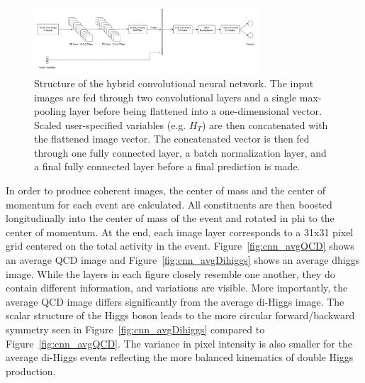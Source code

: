 \begin{figure}[!h] 
\begin{center}
\includegraphics*[width=0.75\textwidth] {CNN/figures/hybridCNN.png}
\caption{Structure of the hybrid convolutional neural network. The input images are fed through two convolutional layers and a single max-pooling layer before being flattened into a one-dimensional vector. Scaled user-specified variables (e.g. $H_{T}$) are then concatenated with the flattened image vector. The concatenated vector is then fed through one fully connected layer, a batch normalization layer, and a final fully connected layer before a final prediction is made.}
  \label{fig:cnn_hybrid}
\end{center}
\end{figure}

In order to produce coherent images, the center of mass and the center of momentum for each event are calculated. All constituents are then boosted longitudinally into the center of mass of the event and rotated in phi to the center of momentum. At the end, each image layer corresponds to a 31x31 pixel grid centered on the total activity in the event. Figure~\ref{fig:cnn_avgQCD} shows an average QCD image and Figure~\ref{fig:cnn_avgDihiggs} shows an average dhiggs image. While the layers in each figure closely resemble one another, they do contain different information, and variations are visible. More importantly, the average QCD image differs significantly from the average di-Higgs image. The scalar structure of the Higgs boson leads to the more circular forward/backward symmetry seen in Figure~\ref{fig:cnn_avgDihiggs} compared to Figure~\ref{fig:cnn_avgQCD}. The variance in pixel intensity is also smaller for the average di-Higgs events reflecting the more balanced kinematics of double Higgs production.

